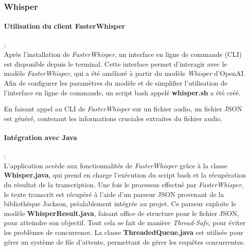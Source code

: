 \subsubsection{Whisper}
\label{sec:whisperImpl}

\paragraph*{Utilisation du client FasterWhisper} : \\ Après l'installation de
\textit{FasterWhisper}, un interface en ligne de commande (CLI) est disponible
depuis le terminal. Cette interface permet d'interagir avec le modèle
\textit{FasterWhisper}, qui a été amélioré à partir du modèle \textit{Whisper}
d'OpenAI. Afin de configurer les paramètres du modèle et de simplifier
l'utilisation de l'interface en ligne de commande, un script bash appelé
\textbf{whisper.sh} a été créé.

En faisant appel au CLI de \textit{FasterWhisper} sur un fichier audio, un
fichier JSON est généré, contenant les informations cruciales extraites du
fichier audio.

\paragraph*{Intégration avec Java}: \\ L'application accède aux fonctionnalités de
\textit{FasterWhisper} grâce à la classe \textbf{Whisper.java}, qui prend en
charge l'exécution du script bash et la récupération du résultat de la
transcription. Une fois le processus effectué par \textit{FasterWhisper}, le
texte transcrit est récupéré à l'aide d'un parseur JSON provenant de la
bibliothèque Jackson, préalablement intégrée au projet. Ce parseur exploite le
modèle \textbf{WhisperResult.java}, faisant office de structure pour le fichier
JSON, pour atteindre son objectif. Tout cela se fait de manière
\textit{Thread-Safe}, pour éviter les problèmes de concurrence. La classe
\textbf{ThreadedQueue.java} est utilisée pour gérer un système de file
d'attente, permettant de gérer les requêtes concurrentes.